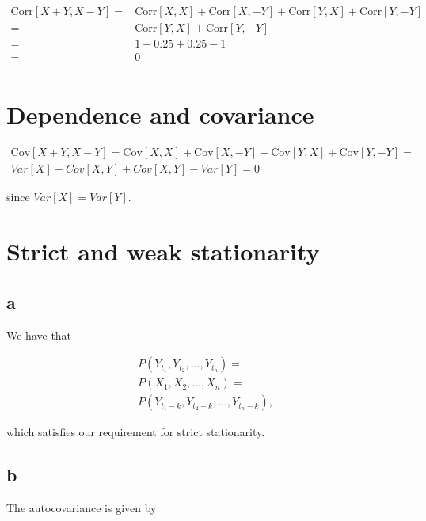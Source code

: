 \documentclass[]{book}
\theoremstyle{definition}
\theoremstyle{definition}
\theoremstyle{remark}
\begin{document}
\begin{align}
\text{Corr}[X+Y, X-Y] = & \text{Corr}[X,X] + \text{Corr}[X,-Y] +
                          \text{Corr}[Y,X] + \text{Corr}[Y,-Y] \\
                      = & \text{Corr}[Y,X] + \text{Corr}[Y,-Y] \\
                      = & 1 - 0.25 + 0.25 -1 \\
                      = & 0 \\
\end{align}

\section{Dependence and covariance}\label{dependence-and-covariance}

\begin{gather*}
\text{Cov}[X+Y,X-Y] = \text{Cov}[X,X] + \text{Cov}[X,-Y] +
  \text{Cov}[Y,X] + \text{Cov}[Y, -Y] = \\
Var[X] - Cov[X,Y] + Cov[X,Y] - Var[Y] = 0
\end{gather*}

since \(Var[X] = Var[Y]\).

\section{Strict and weak
stationarity}\label{strict-and-weak-stationarity}

\subsection*{a}\label{a-1}

We have that

\begin{gather*}
P(Y_{t_1}, Y_{t_2}, \dots, Y_{t_n}) = \\
  P(X_1, X_2, \dots, X_n) = \\
  P(Y_{t_1 - k}, Y_{t_2 - k}, \dots, Y_{t_n - k}),
\end{gather*}

which satisfies our requirement for strict stationarity.

\subsection*{b}\label{b-1}

The autocovariance is given by
\end{document}
